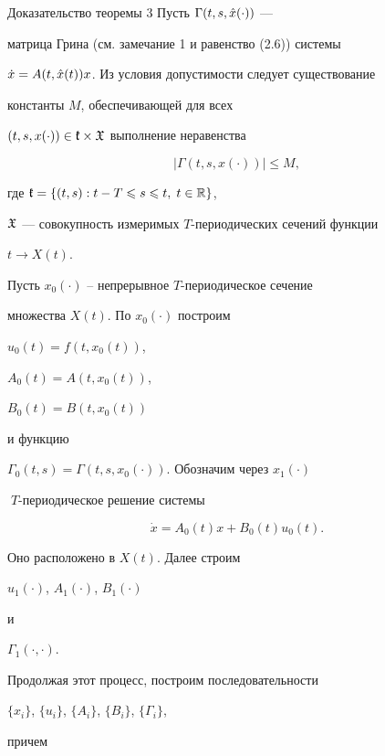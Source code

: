 \begin{pf*}{Доказательство теоремы 3} Пусть $\Gamma(t,s,\Hat x(\cdot))$ ---


матрица Грина (см. замечание 1 и равенство (2.6)) системы


$\Dot x = A(t,\Hat x(t))x$. Из условия допустимости следует существование


константы $M$, обеспечивающей для всех


$(t,s,x(\cdot)) \in \frak \Pi\times \frak X$ выполнение неравенства


%


\begin{equation}


|\Gamma(t,s,x(\cdot))|\le M,


\end{equation}


%


где $\frak \Pi=\{(t,s) : t - T\le s \le t,\; t\in \Bbb R \}$,


$\frak X$ --- совокупность измеримых $T$-периодических сечений функции


$t\to X(t)$.





Пусть $x_0(\cdot)$ -- непрерывное $T$-периодическое сечение


множества $X(t)$. По $x_0(\cdot)$ построим


$u_0(t)=f(t,x_0(t))$,


$A_0(t)=A(t,x_0(t))$,


$B_0(t)=B(t,x_0(t))$


и функцию


$\Gamma_0(t,s)=\Gamma(t,s,x_0(\cdot))$. Обозначим через $x_1(\cdot)\;$


$\;T$-периодическое решение системы


$$


\Dot x = A_0(t)x + B_0(t)u_0(t).


$$


Оно расположено в $X(t).$ Далее строим


$u_1(\cdot)$, $A_1(\cdot)$, $B_1(\cdot)$


и


$\Gamma_1(\cdot,\cdot)$.


Продолжая этот процесс, построим последовательности


$\{x_i\}$, $\{u_i\}$, $\{A_i\}$, $\{B_i\}$, $\{\Gamma_i\}$,


причем


%



\end{pf*}
